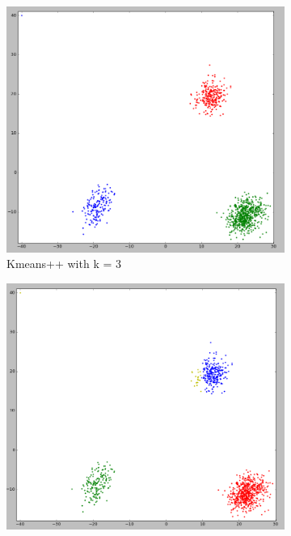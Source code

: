 \begin{figure}
  \begin{subfigure}{.33\textwidth}
    \centering
    \includegraphics[width=\textwidth]{shots/clusters-kmeanspp-3}
    \caption{Kmeans++ with k = 3}
    \label{1-trilinear-compositing}
  \end{subfigure}
  \begin{subfigure}{.33\textwidth}
    \centering
    \includegraphics[width=\textwidth]{shots/clusters-kmeanspp-4}

\end{subfigure}
\end{figure}

